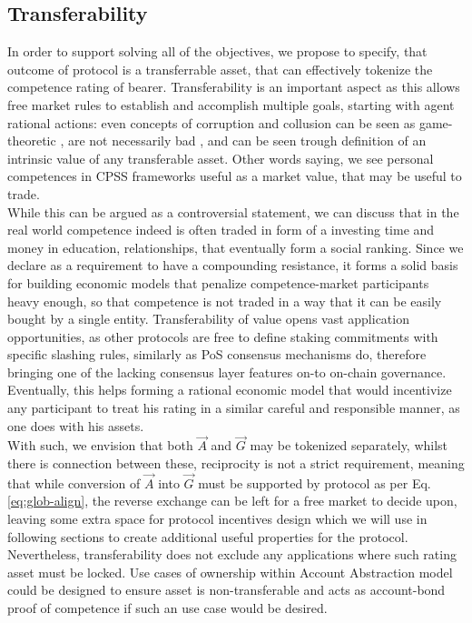 \documentclass{article}
\begin{document}
\begin{CJK}{UTF8}{gbsn}
\begin{multicols}{2}
        \subsection{Transferability}
        \label{sec:transferability}
        In order to support solving all of the objectives, we propose to specify, that outcome of protocol is a transferrable asset, that can effectively tokenize the competence rating of bearer.
        Transferability is an important aspect as this allows free market rules to establish and accomplish multiple goals, starting with agent rational actions: even concepts of corruption and collusion can be seen as game-theoretic \cite{Macrae1982}, are not necessarily bad \cite{Leff1964}, and can be seen trough definition of an intrinsic value of any transferable asset. Other words saying, we see personal competences in CPSS frameworks useful as a market value, that may be useful to trade. \\While this can be argued as a controversial statement, we can discuss that in the real world competence indeed is often traded in form of a investing time and money in education, relationships, that eventually form a social ranking. Since we declare as a requirement to have a compounding resistance, it forms a solid basis for building economic models that penalize competence-market participants heavy enough,  so that competence is not traded in a way that it can be easily bought by a single entity.
        Transferability of value opens vast application opportunities, as other protocols are free to define staking commitments with specific slashing rules, similarly as PoS consensus mechanisms do, therefore bringing one of the lacking consensus layer features on-to on-chain governance. Eventually, this helps forming a rational economic model that would incentivize any participant to treat his rating in a similar careful and responsible manner, as one does with his assets.\\
        With such, we envision that both ${\vec{A}}$ and ${\vec{G}}$ may be tokenized separately, whilst there is connection between these, reciprocity is not a strict requirement, meaning that while conversion of ${\vec{A}}$ into ${\vec{G}}$ must be supported by protocol as per Eq. \ref{eq:glob-align}, the reverse exchange can be left for a free market to decide upon, leaving some extra space for protocol incentives design which we will use in following sections to create additional useful properties for the protocol.
        Nevertheless, transferability does not exclude any applications where such rating asset must be locked. Use cases of ownership within Account Abstraction\cite{Qin2023} model could be designed to ensure asset is non-transferable and acts as account-bond proof of competence if such an use case would be desired.\\

\end{multicols}
\end{CJK}
\end{document}
